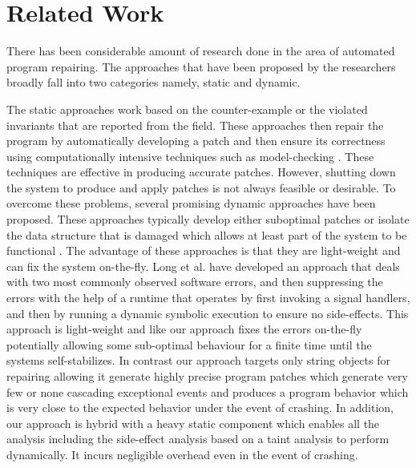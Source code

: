 \section{Related Work}
\label{sec:relatedWork}

There has been considerable amount of research done in the area of 
automated program repairing. The approaches that have been proposed by the researchers
broadly fall into two categories namely, static and dynamic.

The static approaches work based on the counter-example or the violated invariants that
are reported from the field. These approaches then repair the program by automatically developing a patch
and then ensure its correctness using computationally intensive techniques such as model-checking \cite{biere2014, wei-issta-2010}.
These techniques are effective in producing accurate patches. However, shutting
down the system to produce and apply patches is not always feasible 
or desirable. To overcome these problems, several promising dynamic approaches have been proposed. These approaches
typically develop either suboptimal patches or isolate the data structure that is damaged which allows at least part of the system
to be functional \cite{conf/issre/DemskyR03, conf/icse/DemskyR05, conf/issta/DemskyEGMPR06}. The advantage of these approaches
is that they are light-weight and can fix the system on-the-fly. Long et al. \cite{conf/pldi/LongSR14} have developed
an approach that deals with two most commonly observed software errors, and then suppressing the errors with the help 
of a runtime that operates by first invoking a  signal handlers, and then by running a dynamic symbolic execution to ensure no side-effects.
This approach is light-weight and like our approach fixes the errors on-the-fly potentially allowing some sub-optimal behaviour for a finite time until the systems self-stabilizes.
In contrast our approach targets only string objects for repairing allowing it generate highly precise program patches which generate very few or none cascading exceptional events and 
produces a program behavior which is very close to the expected behavior under the event of crashing. 
In addition, our approach is hybrid with a heavy static component which enables all the analysis including the side-effect analysis
based on a taint analysis to perform dynamically. It incurs negligible overhead even in the event of crashing.


